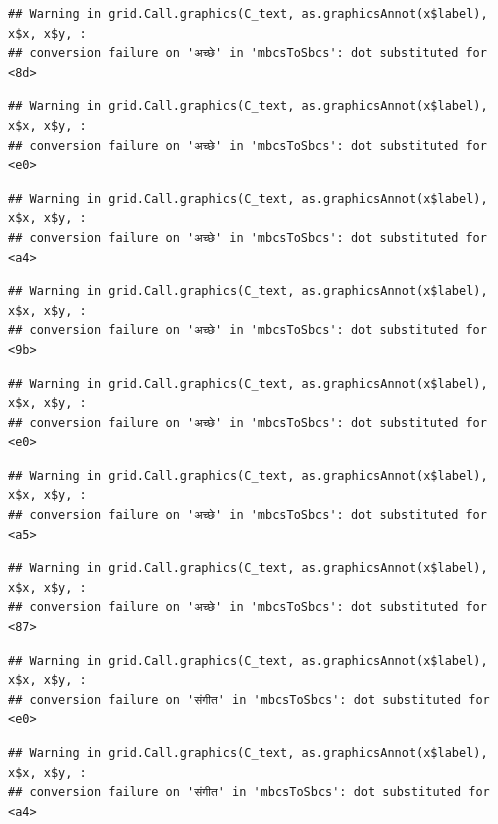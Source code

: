 \documentclass[
]{article}
\begin{document}
\begin{verbatim}
## Warning in grid.Call.graphics(C_text, as.graphicsAnnot(x$label), x$x, x$y, :
## conversion failure on 'अच्छे' in 'mbcsToSbcs': dot substituted for <8d>
\end{verbatim}

\begin{verbatim}
## Warning in grid.Call.graphics(C_text, as.graphicsAnnot(x$label), x$x, x$y, :
## conversion failure on 'अच्छे' in 'mbcsToSbcs': dot substituted for <e0>
\end{verbatim}

\begin{verbatim}
## Warning in grid.Call.graphics(C_text, as.graphicsAnnot(x$label), x$x, x$y, :
## conversion failure on 'अच्छे' in 'mbcsToSbcs': dot substituted for <a4>
\end{verbatim}

\begin{verbatim}
## Warning in grid.Call.graphics(C_text, as.graphicsAnnot(x$label), x$x, x$y, :
## conversion failure on 'अच्छे' in 'mbcsToSbcs': dot substituted for <9b>
\end{verbatim}

\begin{verbatim}
## Warning in grid.Call.graphics(C_text, as.graphicsAnnot(x$label), x$x, x$y, :
## conversion failure on 'अच्छे' in 'mbcsToSbcs': dot substituted for <e0>
\end{verbatim}

\begin{verbatim}
## Warning in grid.Call.graphics(C_text, as.graphicsAnnot(x$label), x$x, x$y, :
## conversion failure on 'अच्छे' in 'mbcsToSbcs': dot substituted for <a5>
\end{verbatim}

\begin{verbatim}
## Warning in grid.Call.graphics(C_text, as.graphicsAnnot(x$label), x$x, x$y, :
## conversion failure on 'अच्छे' in 'mbcsToSbcs': dot substituted for <87>
\end{verbatim}

\begin{verbatim}
## Warning in grid.Call.graphics(C_text, as.graphicsAnnot(x$label), x$x, x$y, :
## conversion failure on 'संगीत' in 'mbcsToSbcs': dot substituted for <e0>
\end{verbatim}

\begin{verbatim}
## Warning in grid.Call.graphics(C_text, as.graphicsAnnot(x$label), x$x, x$y, :
## conversion failure on 'संगीत' in 'mbcsToSbcs': dot substituted for <a4>
\end{verbatim}
\end{document}
